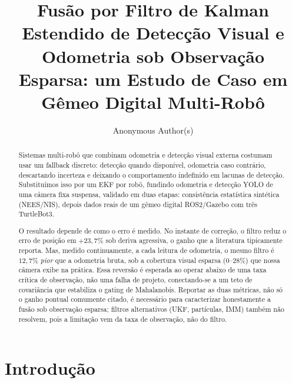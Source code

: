 \documentclass[runningheads]{llncs}
\begin{document}
\title{Fusão por Filtro de Kalman Estendido de Detecção Visual e Odometria sob Observação Esparsa: um Estudo de Caso em Gêmeo Digital Multi-Robô}


\author{Anonymous Author(s)}



\maketitle

\begin{abstract}
Sistemas multi-robô que combinam odometria e detecção visual externa
costumam usar um fallback discreto: detecção quando disponível,
odometria caso contrário, descartando incerteza e deixando o
comportamento indefinido em lacunas de detecção. Substituímos isso por
um EKF por robô, fundindo odometria e detecção YOLO de uma câmera fixa
suspensa, validado em duas etapas: consistência estatística sintética
(NEES/NIS), depois dados reais de um gêmeo digital ROS2/Gazebo com
três TurtleBot3.

O resultado depende de como o erro é medido. No instante de correção,
o filtro reduz o erro de posição em $+23,7\%$ sob deriva agressiva, o
ganho que a literatura tipicamente reporta. Mas, medido continuamente,
a cada leitura de odometria, o mesmo filtro é $12,7\%$ \emph{pior} que
a odometria bruta, sob a cobertura visual esparsa
(0--28\%) que nossa câmera exibe na prática. Essa reversão é esperada
ao operar abaixo de uma taxa crítica de observação, não uma falha de
projeto, conectando-se a um teto de covariância que estabiliza o
gating de Mahalanobis. Reportar as duas
métricas, não só o ganho pontual comumente citado, é necessário para
caracterizar honestamente a fusão sob observação esparsa; filtros
alternativos (UKF, partículas, IMM) também não resolvem, pois a
limitação vem da taxa de observação, não do filtro.

\end{abstract}

\section{Introdução}
\end{document}
